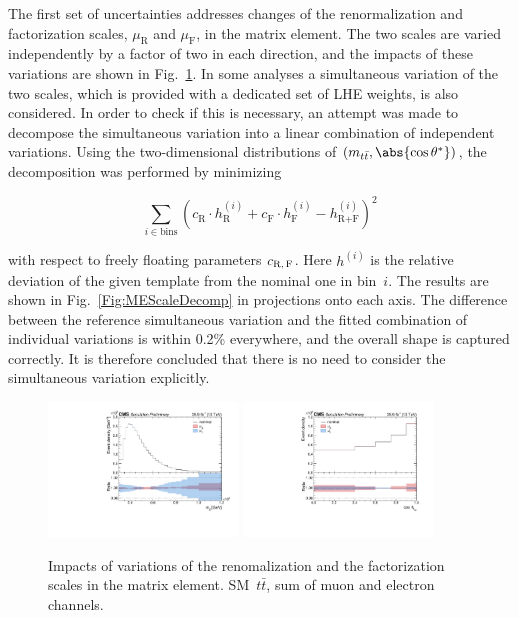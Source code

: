 The first set of uncertainties addresses changes of the renormalization and factorization scales, $\mu_\text{R}$ and $\mu_\text{F}$, in the matrix element.
The two scales are varied independently by a factor of two in each direction, and the impacts of these variations are shown in Fig.~\ref{Fig:SystMEScale}.
In some analyses a simultaneous variation of the two scales, which is provided with a dedicated set of LHE weights, is also considered.
In order to check if this is necessary, an attempt was made to decompose the simultaneous variation into a linear combination of independent variations.
Using the two-dimensional distributions of $(m_{t\bar t}, \abs{\cos\theta^*})$, the decomposition was performed by minimizing
\begin{linenomath}
\begin{equation}
 \sum_{i \in \text{bins}} \left(c_\text{R} \cdot h_\text{R}^{(i)} + c_\text{F} \cdot h_\text{F}^{(i)} - h_\text{R+F}^{(i)}\right)^2
\end{equation}
\end{linenomath}
with respect to freely floating parameters $c_\text{R,\,F}$.
Here $h^{(i)}$ is the relative deviation of the given template from the nominal one in bin~$i$.
The results are shown in Fig.~\ref{Fig:MEScaleDecomp} in projections onto each axis.
The difference between the reference simultaneous variation and the fitted combination of individual variations is within 0.2\% everywhere, and the overall shape is captured correctly.
It is therefore concluded that there is no need to consider the simultaneous variation explicitly.

\begin{figure}
  \centering
  \includegraphics[width=0.45\textwidth]{fig/chapt7/syst/impacts/MassTT/scaleME.pdf}
  \includegraphics[width=0.45\textwidth]{fig/chapt7/syst/impacts/CosTopLepTT/scaleME.pdf}
  \caption{Impacts of variations of the renomalization and the factorization scales in the matrix element. SM~$t\bar t$, sum of muon and electron channels.}
  \label{Fig:SystMEScale}
\end{figure}

